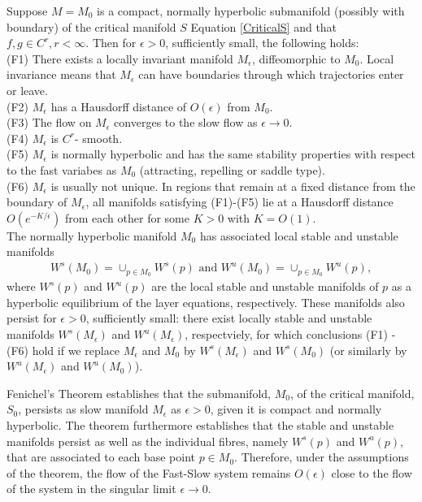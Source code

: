 \begin{theorem} \label{Fenichel}	
	Suppose $M=M_0$ is a compact, normally hyperbolic submanifold  (possibly with boundary) of the critical manifold $S$ Equation \ref{CriticalS} 	and  that $f, g \in C^r, r < \infty $. Then for $\epsilon >0$, sufficiently small, the following holds:\\
	(F1) There exists a locally invariant manifold $M_{\epsilon}$, diffeomorphic to  $M_0$. Local invariance means that $M_{\epsilon}$ can have boundaries through which trajectories enter or leave.\\
	(F2) $M_{\epsilon}$ has a Hausdorff distance of $O(\epsilon)$ from $M_0$.\\
	(F3) The flow on $M_{\epsilon}$  converges to the slow flow as $\epsilon \to 0$.\\
	(F4) $M_{\epsilon}$ is $C^r$- smooth.\\
	(F5) $M_{\epsilon}$ is normally hyperbolic and has the same stability properties with respect to the fast variabes as $M_0$ (attracting, repelling or saddle type).\\
	(F6) $M_{\epsilon}$ is usually not unique. In regions that remain at a fixed distance from the boundary of  $M_{\epsilon}$, all manifolds satisfying (F1)-(F5) lie at a Hausdorff distance $O(e^{-K/\epsilon})$ from each other for some $K>0$ with $K=O(1)$.\\
	The normally hyperbolic manifold $M_0$ has associated local stable and unstable manifolds
	\begin{align*}
	W^s(M_0) =\cup_{p \in M_0} W^s(p) \textrm{\ \ and\ \ } W^u(M_0) =\cup_{p \in M_0} W^u(p),
	\end{align*}
	where  $W^s(p)$ and $W^u(p)$ are the local stable and unstable manifolds of $p$ as a hyperbolic equilibrium of the layer equations, respectively. These manifolds also persist for $\epsilon > 0$, sufficiently small: there exist locally stable and unstable manifolds $W^s(M_\epsilon)$ and $W^u(M_\epsilon)$, respectviely, for which conclusions (F1) - (F6) hold if we replace $M_\epsilon$ and $M_0$ by  $W^s(M_\epsilon)$ and $W^s(M_0)$ (or similarly by  $W^u(M_\epsilon)$ and $W^u(M_0)$).
\end{theorem} 
Fenichel's Theorem establishes that the submanifold, $M_0$, of the critical manifold, $S_0$, persists as slow manifold $M_\epsilon$ as $\epsilon >0$, given it is compact and normally hyperbolic. The theorem furthermore establishes that the stable and unstable manifolds persist as well as the individual fibres, namely $W^s(p)$ and $W^u(p)$, that are associated to each base point $p \in M_0$.
Therefore, under the assumptions of the theorem, the flow of the Fast-Slow system remains $O(\epsilon)$ close to the flow of the system in the singular limit $\epsilon \to 0$.\\

